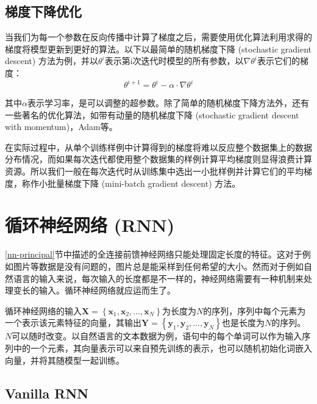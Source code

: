 \subsection{梯度下降优化}

当我们为每一个参数在反向传播中计算了梯度之后，需要使用优化算法利用求得的梯度将模型更新到更好的算法。以下以最简单的随机梯度下降 (stochastic gradient descent) 方法为例，并以$\theta^i$表示第i次迭代时模型的所有参数，以$\nabla\theta^i$表示它们的梯度：
\begin{equation}
    \theta^{i+1}=\theta^i-\alpha\cdot\nabla\theta^i
\end{equation}

其中$\alpha$表示学习率，是可以调整的超参数。除了简单的随机梯度下降方法外，还有一些著名的优化算法，如带有动量的随机梯度下降 (stochastic gradient descent with momentum)，Adam\cite{Adam14}等。

在实际过程中，从单个训练样例中计算得到的梯度将难以反应整个数据集上的数据分布情况，而如果每次迭代都使用整个数据集的样例计算平均梯度则显得浪费计算资源。所以我们一般在每次迭代时从训练集中选出一小批样例并计算它们的平均梯度，称作小批量梯度下降 (mini-batch gradient descent) 方法。

\section{循环神经网络 (RNN)}

\ref{nn-principal}节中描述的全连接前馈神经网络只能处理固定长度的特征。这对于例如图片等数据是没有问题的，图片总是能采样到任何希望的大小。然而对于例如自然语言的输入来说，每次输入的长度都是不一样的，神经网络需要有一种机制来处理变长的输入。循环神经网络就应运而生了。

循环神经网络的输入$\bm{X}=\left\{\bm{x}_1,\bm{x}_2,\ldots,\bm{x}_N\right\}$为长度为$N$的序列，序列中每个元素为一个表示该元素特征的向量，其输出$\bm{Y}=\left\{\bm{y}_1,\bm{y}_2,\ldots,\bm{y}_N\right\}$也是长度为$N$的序列。$N$可以随时改变。以自然语言的文本数据为例，语句中的每个单词可以作为输入序列中的一个元素，其向量表示可以来自预先训练的表示，也可以随机初始化词嵌入向量，并将其随模型一起训练。

\subsection{Vanilla RNN}

